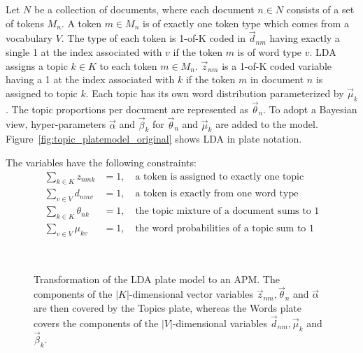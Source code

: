 Let $N$ be a collection of documents, where each document $n \in N$ consists of a set of tokens $M_n$. A token $m \in M_n$ is of exactly one token type which comes from a vocabulary $V$. The type of each token is 1-of-K coded in $\vec d_{nm}$ having exactly a single 1 at the index associated with $v$ if the token $m$ is of word type $v$. LDA assigns a topic $k \in K$ to each token $m \in M_n$. $\vec z_{nm}$ is a 1-of-K coded variable having a 1 at the index associated with $k$ if the token $m$ in document $n$ is assigned to topic $k$. Each topic has its own word distribution parameterized by $\vec \mu_k$. The topic proportions per document are represented as $\vec \theta_n$. To adopt a Bayesian view, hyper-parameters $\vec \alpha$ and $\vec \beta_k$ for $\vec \theta_n$ and $\vec \mu_k$ are added to the model. Figure~\ref{fig:topic_platemodel_original} shows LDA in plate notation.

The variables have the following constraints:
\begin{align}
\sum_{k \in K} z_{nmk} &= 1,\quad \text{a token is assigned to exactly one topic}\\
\sum_{v \in V} d_{nmv} &= 1,\quad \text{a token is exactly from one word type}\\
\sum_{k \in K} \theta_{nk} &= 1,\quad \text{the topic mixture of a document sums to 1}\\
\sum_{v \in V} \mu_{kv} &= 1,\quad \text{the word probabilities of a topic sum to 1}
\end{align}

\begin{figure}[t]
\begin{minipage}[t]{0.49\linewidth}
	\begin{center}
	\end{center}
\end{minipage}
\hspace{0.0cm}
\begin{minipage}[t]{0.49\linewidth}
	\begin{center}
	\end{center}
\end{minipage}\\
\caption[Transformation of LDA plate model to an APM]{Transformation of the LDA plate model to an APM. The components of the $|K|$-dimensional vector variables $\vec z_{nm}, \vec \theta_n$ and $\vec \alpha$ are then covered by the Topics plate, whereas the Words plate covers the components of the $|V|$-dimensional variables $\vec d_{nm}, \vec \mu_k$ and $\vec \beta_k$.}
\label{img:topic_platemodels}
\end{figure}

